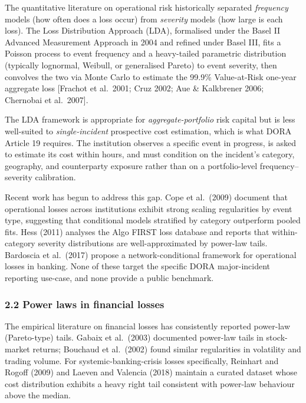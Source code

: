 \documentclass[
]{article}
\begin{document}
The quantitative literature on operational risk historically separated
\emph{frequency} models (how often does a loss occur) from
\emph{severity} models (how large is each loss). The Loss Distribution
Approach (LDA), formalised under the Basel II Advanced Measurement
Approach in 2004 and refined under Basel III, fits a Poisson process to
event frequency and a heavy-tailed parametric distribution (typically
lognormal, Weibull, or generalised Pareto) to event severity, then
convolves the two via Monte Carlo to estimate the 99.9\% Value-at-Risk
one-year aggregate loss {[}Frachot et al.~2001; Cruz 2002; Aue \&
Kalkbrener 2006; Chernobai et al.~2007{]}.

The LDA framework is appropriate for \emph{aggregate-portfolio} risk
capital but is less well-suited to \emph{single-incident} prospective
cost estimation, which is what DORA Article 19 requires. The institution
observes a specific event in progress, is asked to estimate its cost
within hours, and must condition on the incident's category, geography,
and counterparty exposure rather than on a portfolio-level
frequency--severity calibration.

Recent work has begun to address this gap. Cope et al.~(2009) document
that operational losses across institutions exhibit strong scaling
regularities by event type, suggesting that conditional models
stratified by category outperform pooled fits. Hess (2011) analyses the
Algo FIRST loss database and reports that within-category severity
distributions are well-approximated by power-law tails. Bardoscia et
al.~(2017) propose a network-conditional framework for operational
losses in banking. None of these target the specific DORA major-incident
reporting use-case, and none provide a public benchmark.

\subsubsection{2.2 Power laws in financial
losses}\label{power-laws-in-financial-losses}

The empirical literature on financial losses has consistently reported
power-law (Pareto-type) tails. Gabaix et al.~(2003) documented power-law
tails in stock-market returns; Bouchaud et al.~(2002) found similar
regularities in volatility and trading volume. For
systemic-banking-crisis losses specifically, Reinhart and Rogoff (2009)
and Laeven and Valencia (2018) maintain a curated dataset whose cost
distribution exhibits a heavy right tail consistent with power-law
behaviour above the median.
\end{document}
